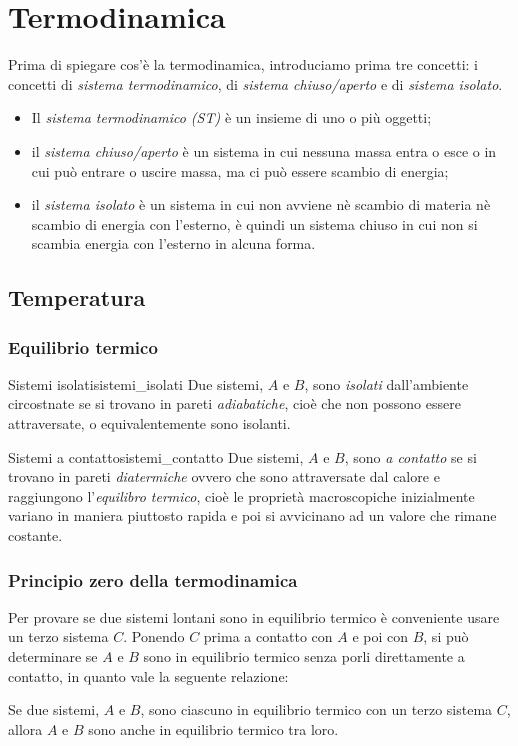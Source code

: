 \documentclass[12pt]{report}
\newcounter{definition}
\newcommand{\nmu}{}
\begin{document}
	\chapter{Termodinamica}
	Prima di spiegare cos'è la termodinamica, introduciamo prima tre concetti: i concetti di \textit{sistema termodinamico}, di \textit{sistema chiuso/aperto} e di \textit{sistema isolato}.
	\begin{itemize}
		\item  Il \textit{sistema termodinamico (ST)} è un insieme di uno o più oggetti;
		\item il \textit{sistema chiuso/aperto} è un sistema in cui nessuna massa entra o esce o in cui può entrare o uscire massa, ma ci può essere scambio di energia;
		\item il \textit{sistema isolato} è un sistema in cui non avviene nè scambio di materia nè scambio di energia con l'esterno, è quindi un sistema chiuso in cui non si scambia energia con l'esterno in alcuna forma.
	\end{itemize}
	\section{Temperatura}
	\subsection{Equilibrio termico}
	\begin{definition}{\nmu Sistemi isolati}{sistemi_isolati}
		Due sistemi, $A$ e $B$, sono \textit{isolati} dall'ambiente circostnate se si trovano in pareti \textit{adiabatiche}, cioè che non possono essere attraversate, o equivalentemente sono isolanti.
	\end{definition}
	\begin{definition}{\nmu Sistemi a contatto}{sistemi_contatto}
		Due sistemi, $A$ e $B$, sono \textit{a contatto} se si trovano in pareti \textit{diatermiche} ovvero che sono attraversate dal calore e raggiungono l'\textit{equilibro termico}, cioè le proprietà macroscopiche inizialmente variano in maniera piuttosto rapida e poi si avvicinano ad un valore che rimane costante.
	\end{definition}
	\subsection{Principio zero della termodinamica}
	Per provare se due sistemi lontani sono in equilibrio termico è conveniente usare un terzo sistema $C$. Ponendo $C$ prima a contatto con $A$ e poi con $B$, si può determinare se $A$ e $B$ sono in equilibrio termico senza porli direttamente a contatto, in quanto vale la seguente relazione:
	\begin{center}
		Se due sistemi, $A$ e $B$, sono ciascuno in equilibrio termico con un terzo sistema $C$, allora $A$ e $B$ sono anche in equilibrio termico tra loro.
	\end{center}
\end{document}
